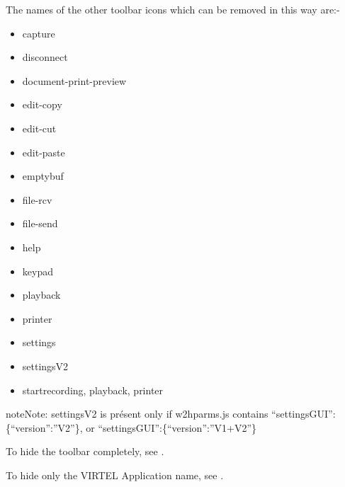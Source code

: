 \documentclass[letterpaper,10pt,english]{sphinxmanual}
\begin{document}

The names of the other toolbar icons which can be removed in this way are:-
\begin{itemize}
\item {} 
capture

\item {} 
disconnect

\item {} 
document-print-preview

\item {} 
edit-copy

\item {} 
edit-cut

\item {} 
edit-paste

\item {} 
emptybuf

\item {} 
file-rcv

\item {} 
file-send

\item {} 
help

\item {} 
keypad

\item {} 
playback

\item {} 
printer

\item {} 
settings

\item {} 
settingsV2

\item {} 
startrecording, playback, printer

\end{itemize}

\begin{sphinxadmonition}{note}{Note:}
settingsV2 is présent only if w2hparms.js contains “settingsGUI”:\{“version”:”V2”\}, or “settingsGUI”:\{“version”:”V1+V2”\}
\end{sphinxadmonition}

To hide the toolbar completely, see {\hyperref[\detokenize{User_Guide:v457ug-hide-toolbar}]{}}.

To hide only the VIRTEL Application name, see {\hyperref[\detokenize{User_Guide:v457ug-hide-information}]{}}.
\end{document}
